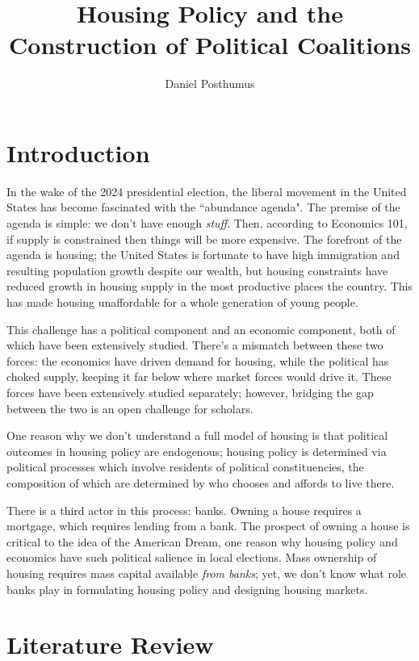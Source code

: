 \documentclass{article}
\begin{document}
\title{Housing Policy and the Construction of Political Coalitions} 
\author{Daniel Posthumus}

\maketitle

\section{Introduction}

In the wake of the 2024 presidential election, the liberal movement in the United States has become fascinated with the ``abundance agenda". The premise of the agenda is simple: we don't have enough \textit{stuff}. Then, according to Economics 101, if supply is constrained then things will be more expensive. The forefront of the agenda is housing; the United States is fortunate to have high immigration and resulting population growth despite our wealth, but housing constraints have reduced growth in housing supply in the most productive places the country. This has made housing unaffordable for a whole generation of young people. 

This challenge has a political component and an economic component, both of which have been extensively studied. There's a mismatch between these two forces: the economics have driven demand for housing, while the political has choked supply, keeping it  far below where market forces would drive it. These forces have been extensively studied separately; however, bridging the gap between the two is an open challenge for scholars. 

One reason why we don't understand a full model of housing is that political outcomes in housing policy are endogenous; housing policy is determined via political processes which involve residents of political constituencies, the composition of which are determined by who chooses and affords to live there. 

There is a third actor in this process: banks. Owning a house requires a mortgage, which requires lending from a bank. The prospect of owning a house is critical to the idea of the American Dream, one reason why housing policy and economics have such political salience in local elections. Mass ownership of housing requires mass capital available \textit{from banks}; yet, we don't know what role banks play in formulating housing policy and designing housing markets. 

\section{Literature Review}
\end{document}
